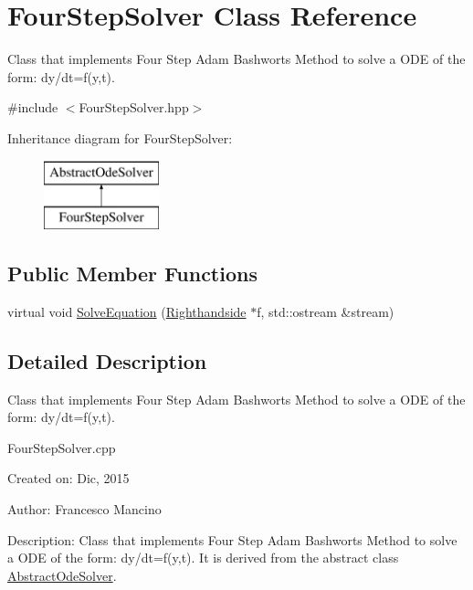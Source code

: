 \hypertarget{class_four_step_solver}{}\section{Four\+Step\+Solver Class Reference}
\label{class_four_step_solver}


Class that implements Four Step Adam Bashworts Method to solve a O\+D\+E of the form\+: dy/dt=f(y,t).  




{\ttfamily \#include $<$Four\+Step\+Solver.\+hpp$>$}

Inheritance diagram for Four\+Step\+Solver\+:\begin{figure}[H]
\begin{center}
\leavevmode
\includegraphics[height=2.000000cm]{class_four_step_solver}
\end{center}
\end{figure}
\subsection*{Public Member Functions}
\begin{DoxyCompactItemize}
\item 
virtual void \hyperlink{class_four_step_solver_a78b7b6af19731e904c4cdd31b5641aa2}{Solve\+Equation} (\hyperlink{class_righthandside}{Righthandside} $\ast$f, std\+::ostream \&stream)
\end{DoxyCompactItemize}


\subsection{Detailed Description}
Class that implements Four Step Adam Bashworts Method to solve a O\+D\+E of the form\+: dy/dt=f(y,t). 

Four\+Step\+Solver.\+cpp

Created on\+: Dic, 2015 \begin{DoxyVerb}Author: Francesco Mancino
\end{DoxyVerb}


Description\+: Class that implements Four Step Adam Bashworts Method to solve a O\+D\+E of the form\+: dy/dt=f(y,t). It is derived from the abstract class \hyperlink{class_abstract_ode_solver}{Abstract\+Ode\+Solver}. 

